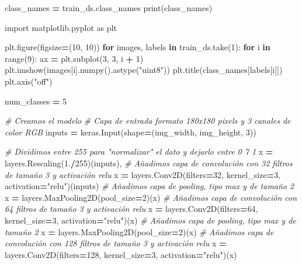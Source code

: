 \documentclass[
  a4paper,
  DIV=11,
  numbers=noendperiod]{scrreprt}
\newenvironment{Shaded}{\begin{snugshade}}{\end{snugshade}}
\newcommand{\BuiltInTok}[1]{#1}
\newcommand{\CommentTok}[1]{\textcolor[rgb]{0.56,0.35,0.01}{\textit{#1}}}
\newcommand{\ControlFlowTok}[1]{\textcolor[rgb]{0.13,0.29,0.53}{\textbf{#1}}}
\newcommand{\DecValTok}[1]{\textcolor[rgb]{0.00,0.00,0.81}{#1}}
\newcommand{\FloatTok}[1]{\textcolor[rgb]{0.00,0.00,0.81}{#1}}
\newcommand{\ImportTok}[1]{#1}
\newcommand{\KeywordTok}[1]{\textcolor[rgb]{0.13,0.29,0.53}{\textbf{#1}}}
\newcommand{\NormalTok}[1]{#1}
\newcommand{\OperatorTok}[1]{\textcolor[rgb]{0.81,0.36,0.00}{\textbf{#1}}}
\newcommand{\StringTok}[1]{\textcolor[rgb]{0.31,0.60,0.02}{#1}}
\begin{document}
\begin{Shaded}
\begin{Highlighting}[numbers=left,,]
\NormalTok{class\_names }\OperatorTok{=}\NormalTok{ train\_ds.class\_names}
\BuiltInTok{print}\NormalTok{(class\_names)}

\ImportTok{import}\NormalTok{ matplotlib.pyplot }\ImportTok{as}\NormalTok{ plt}

\NormalTok{plt.figure(figsize}\OperatorTok{=}\NormalTok{(}\DecValTok{10}\NormalTok{, }\DecValTok{10}\NormalTok{))}
\ControlFlowTok{for}\NormalTok{ images, labels }\KeywordTok{in}\NormalTok{ train\_ds.take(}\DecValTok{1}\NormalTok{):}
  \ControlFlowTok{for}\NormalTok{ i }\KeywordTok{in} \BuiltInTok{range}\NormalTok{(}\DecValTok{9}\NormalTok{):}
\NormalTok{    ax }\OperatorTok{=}\NormalTok{ plt.subplot(}\DecValTok{3}\NormalTok{, }\DecValTok{3}\NormalTok{, i }\OperatorTok{+} \DecValTok{1}\NormalTok{)}
\NormalTok{    plt.imshow(images[i].numpy().astype(}\StringTok{"uint8"}\NormalTok{))}
\NormalTok{    plt.title(class\_names[labels[i]])}
\NormalTok{    plt.axis(}\StringTok{"off"}\NormalTok{)}

\NormalTok{num\_classes }\OperatorTok{=} \DecValTok{5}


\CommentTok{\# Creamos el modelo}
\CommentTok{\# Capa de entrada formato 180x180 pixels y 3 canales de color RGB}
\NormalTok{inputs }\OperatorTok{=}\NormalTok{ keras.Input(shape}\OperatorTok{=}\NormalTok{(img\_width, img\_height, }\DecValTok{3}\NormalTok{))}

\CommentTok{\# Dividimos entre 255 para "normalizar" el dato y dejarlo entre 0 7 1}
\NormalTok{x }\OperatorTok{=}\NormalTok{ layers.Rescaling(}\FloatTok{1.}\OperatorTok{/}\DecValTok{255}\NormalTok{)(inputs),}
\CommentTok{\# Añadimos capa de convolución con 32 filtros de tamaño 3 y activación relu}
\NormalTok{x }\OperatorTok{=}\NormalTok{ layers.Conv2D(filters}\OperatorTok{=}\DecValTok{32}\NormalTok{, kernel\_size}\OperatorTok{=}\DecValTok{3}\NormalTok{, activation}\OperatorTok{=}\StringTok{"relu"}\NormalTok{)(inputs)}
\CommentTok{\# Añadimos capa de pooling, tipo max y de tamaño 2}
\NormalTok{x }\OperatorTok{=}\NormalTok{ layers.MaxPooling2D(pool\_size}\OperatorTok{=}\DecValTok{2}\NormalTok{)(x)}
\CommentTok{\# Añadimos capa de convolución con 64 filtros de tamaño 3 y activación relu}
\NormalTok{x }\OperatorTok{=}\NormalTok{ layers.Conv2D(filters}\OperatorTok{=}\DecValTok{64}\NormalTok{, kernel\_size}\OperatorTok{=}\DecValTok{3}\NormalTok{, activation}\OperatorTok{=}\StringTok{"relu"}\NormalTok{)(x)}
\CommentTok{\# Añadimos capa de pooling, tipo max y de tamaño 2}
\NormalTok{x }\OperatorTok{=}\NormalTok{ layers.MaxPooling2D(pool\_size}\OperatorTok{=}\DecValTok{2}\NormalTok{)(x)}
\CommentTok{\# Añadimos capa de convolución con 128 filtros de tamaño 3 y activación relu}
\NormalTok{x }\OperatorTok{=}\NormalTok{ layers.Conv2D(filters}\OperatorTok{=}\DecValTok{128}\NormalTok{, kernel\_size}\OperatorTok{=}\DecValTok{3}\NormalTok{, activation}\OperatorTok{=}\StringTok{"relu"}\NormalTok{)(x)}


\end{Highlighting}
\end{Shaded}
\end{document}
